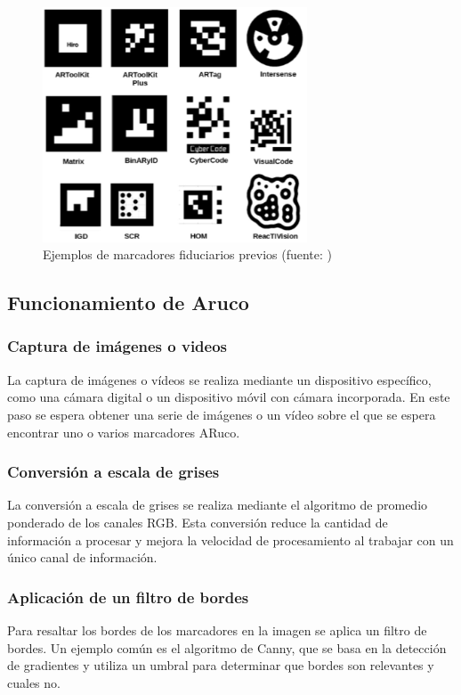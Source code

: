 \begin{figure}
  \centering
  \includegraphics[width=0.7\textwidth]{imaxes/qrtags.png}
  \caption{Ejemplos de marcadores fiduciarios previos (fuente: \cite{GarridoJurado2014})}
  \label{fig:qrtags}
\end{figure}

\subsection{Funcionamiento de Aruco}

\subsubsection*{Captura de imágenes o videos}
La captura de imágenes o vídeos se realiza mediante un dispositivo específico, como una cámara digital o un dispositivo móvil con cámara incorporada. En este paso se espera obtener una serie de imágenes o un vídeo sobre el que se espera encontrar uno o varios marcadores ARuco.
\subsubsection*{Conversión a escala de grises}
La conversión a escala de grises se realiza mediante el algoritmo de promedio ponderado de los canales RGB. Esta conversión reduce la cantidad de información a procesar y mejora la velocidad de procesamiento al trabajar con un único canal de información.
\subsubsection*{Aplicación de un filtro de bordes}
Para resaltar los bordes de los marcadores en la imagen se aplica un filtro de bordes. Un ejemplo común es el algoritmo de Canny, que se basa en la detección de gradientes y utiliza un umbral para determinar que bordes son relevantes y cuales no.
